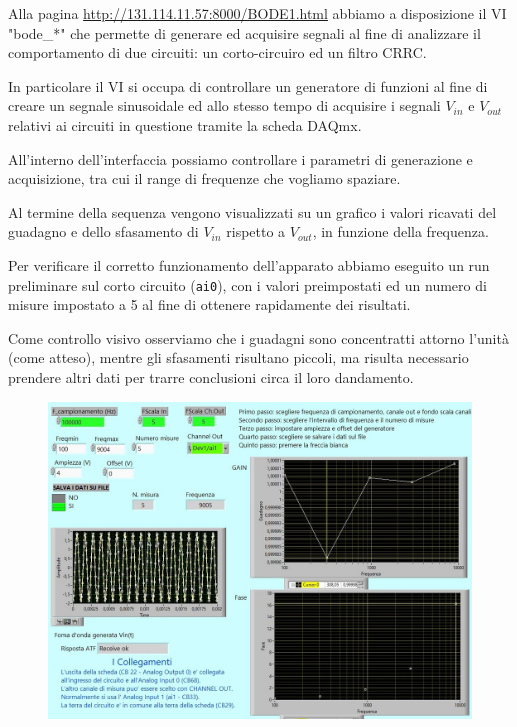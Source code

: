 Alla pagina \textcolor{airforceblue}{\url{http://131.114.11.57:8000/BODE1.html}} abbiamo a disposizione il VI "bode\_*" che permette di generare ed acquisire segnali al fine di analizzare il comportamento di due circuiti: un corto-circuiro ed un filtro CRRC.

In particolare il VI si occupa di controllare un generatore di funzioni al fine di creare un segnale sinusoidale ed allo stesso tempo di acquisire i segnali $V_{in}$ e $V_{out}$ relativi ai circuiti in questione tramite la scheda DAQmx.

All'interno dell'interfaccia possiamo controllare i parametri di generazione e acquisizione, tra cui il range di frequenze che vogliamo spaziare.

Al termine della sequenza vengono visualizzati su un grafico i valori ricavati del guadagno e dello sfasamento di $V_{in}$ rispetto a  $V_{out}$, in funzione della frequenza.

Per verificare il corretto funzionamento dell'apparato abbiamo eseguito un run preliminare sul corto circuito (\verb|ai0|), con i valori preimpostati ed un numero di misure impostato a 5 al fine di ottenere rapidamente dei risultati.

Come controllo visivo osserviamo che i guadagni sono concentratti attorno l'unità (come atteso), mentre gli sfasamenti risultano piccoli, ma risulta necessario prendere altri dati per trarre conclusioni circa il loro dandamento.

\begin{figure}[H]
\caption{}
    \includegraphics[width=12cm]{settimana_2/immagini/corto_1.jpg}
    \centering
\end{figure}

